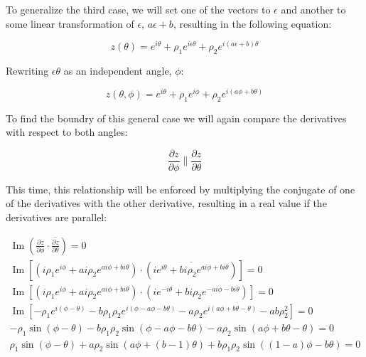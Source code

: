 \documentclass[12pt, a4paper, oneside]{report}
\begin{document}
To generalize the third case, we will set one of the vectors to $\epsilon$ and another to some linear transformation of $\epsilon$, $a\epsilon + b$, resulting in the following equation:

\begin{equation*}
  z(\theta) = e^{i \theta} + \rho_1 e^{i \epsilon \theta} + \rho_2 e^{i (a \epsilon + b) \theta}
\end{equation*}

Rewriting $\epsilon \theta$ as an independent angle, $\phi$:

\begin{equation}
  z(\theta, \phi) = e^{i \theta} + \rho_1 e^{i \phi} + \rho_2 e^{i (a \phi + b \theta)}
\end{equation}

To find the boundry of this general case we will again compare the derivatives with respect to both angles:

\begin{equation*}
  \frac{\partial z}{\partial \phi} \parallel \frac{\partial z}{\partial \theta}
\end{equation*}

This time, this relationship will be enforced by multiplying the conjugate of one of the derivatives with the other derivative, resulting in a real value if the derivatives are parallel:

\begin{gather*}
  \operatorname{Im}(\frac{\partial z}{\partial \phi} \cdot \overline{\frac{\partial z}{\partial \theta}}) = 0 \\
  \operatorname{Im}[(i \rho_1 e^{i \phi} + a i \rho_2 e^{a i \phi + b i \theta}) \cdot (\overline{i e^{i \theta} + b i \rho_2 e^{a i \phi + b i \theta}})] = 0 \\
  \operatorname{Im}[(i \rho_1 e^{i \phi} + a i \rho_2 e^{a i \phi + b i \theta}) \cdot ({i e^{- i \theta} + b i \rho_2 e^{- a i \phi - b i \theta}})] = 0 \\
  \operatorname{Im}[-\rho_1 e^{i (\phi - \theta)} - b \rho_1 \rho_2 e^{i (\phi - a \phi - b \theta)} - a \rho_2 e^{i(a \phi + b \theta - \theta)} - a b \rho_2 ^ 2] = 0 \\
  -\rho_1 \sin(\phi - \theta) - b \rho_1 \rho_2 \sin(\phi - a \phi - b \theta) - a \rho_2 \sin(a \phi + b \theta - \theta) = 0 \\
  \boxed{\rho_1 \sin(\phi - \theta) + a \rho_2 \sin(a \phi + (b - 1) \theta) + b \rho_1 \rho_2 \sin((1 - a) \phi - b \theta) = 0}
\end{gather*}
\end{document}
